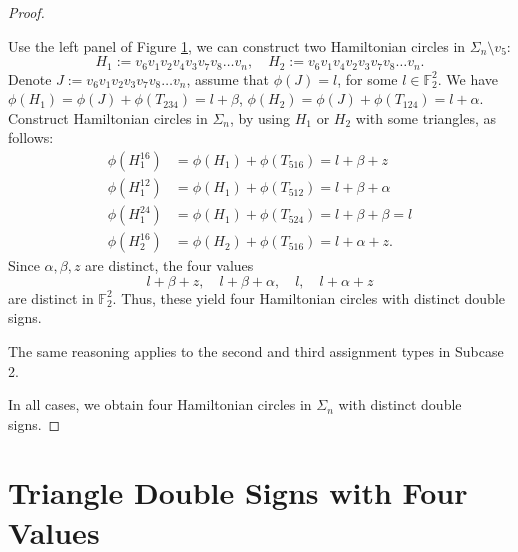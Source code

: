 \documentclass[12pt]{amsart}
\theoremstyle{plain}
\theoremstyle{definition}%
\begin{document}
\begin{proof}
\begin{figure}[H]

 \caption{}
 \label{three4}
\end{figure}

\vspace{1cm}

Use the left panel of Figure \ref{three4}, we can construct two Hamiltonian circles in \(\Sigma_n \setminus v_5\):  
\[
H_1 := v_6 v_1 v_2 v_4 v_3 v_7 v_8 \ldots v_n, 
\quad 
H_2 := v_6 v_1 v_4 v_2 v_3 v_7 v_8 \ldots v_n.
\]
Denote $J:=v_6 v_1 v_2  v_3 v_7 v_8 \ldots v_n$, assume that $\phi(J)=l$, for some $l \in \mathbb{F}_2^2$. We have
$\phi(H_1) = \phi(J) + \phi(T_{234})
= l+ \beta$, \quad
$\phi(H_2) = \phi(J) + \phi(T_{124})= l+ \alpha.$
Construct Hamiltonian circles in $\Sigma_n$, by using $H_1$ or $H_2$ with some triangles, as follows: 
\[
\begin{aligned}
\phi(H_1^{16})&=\phi(H_1)+\phi(T_{516})=l+\beta+z\\
\phi(H_1^{12})&=\phi(H_1)+\phi(T_{512})=l+\beta+\alpha\\
\phi(H_1^{24})&=\phi(H_1)+\phi(T_{524})=l+\beta+\beta=l\\
\phi(H_2^{16})&=\phi(H_2)+\phi(T_{516})=l+\alpha+z.
\end{aligned}
\]
Since $\alpha, \beta,z$ are distinct, the four values 
\[
l+\beta+z,\quad l+\beta+\alpha,\quad l,\quad l+\alpha+z
\]
are distinct in $\mathbb{F}_2^2$. 
Thus, these yield four Hamiltonian circles with distinct double signs.

The same reasoning applies to the second and third assignment types in Subcase 2.

\smallskip
In all cases, we obtain four Hamiltonian circles in $\Sigma_n$ with distinct double signs. 
\end{proof}

\section{Triangle Double Signs with Four Values}
\end{document}
